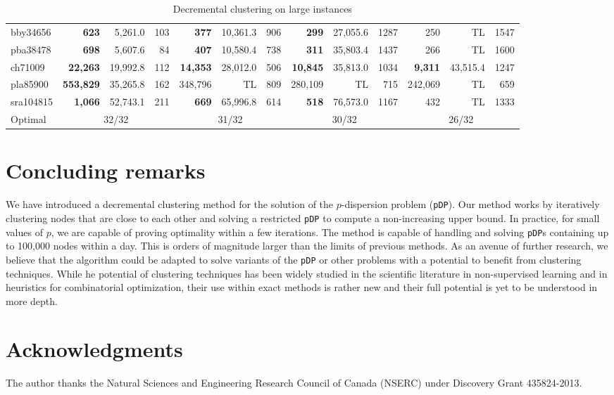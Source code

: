 \documentclass[a4paper,10pt]{article}
\newcommand{\pDP}{\texttt{pDP}}
\begin{document}
\begin{table}[!hbtp]
{\begin{tabular}{|l|rrr|rrr|rrr|rrr|}
			bby34656 & \textbf{623} & 5,261.0 & 103 & \textbf{377} & 10,361.3 & 906 & \textbf{299} & 27,055.6 & 1287 & 250 & TL & 1547\\
			pba38478 & \textbf{698} & 5,607.6 & 84 & \textbf{407} & 10,580.4 & 738 & \textbf{311} & 35,803.4 & 1437 & 266 & TL & 1600\\
			ch71009 & \textbf{22,263} & 19,992.8 & 112 & \textbf{14,353} & 28,012.0 & 506 & \textbf{10,845} & 35,813.0 & 1034 & \textbf{9,311} & 43,515.4 & 1247\\
			pla85900 & \textbf{553,829} & 35,265.8 & 162 & 348,796 & TL & 809 & 280,109 & TL & 715 & 242,069 & TL & 659\\
			sra104815 & \textbf{1,066} & 52,743.1 & 211 & \textbf{669} & 65,996.8 & 614 & \textbf{518} & 76,573.0 & 1167 & 432 & TL & 1333\\
			\hline
			Optimal & \multicolumn{3}{|c|}{32/32} & \multicolumn{3}{|c|}{31/32} & \multicolumn{3}{|c|}{30/32} & \multicolumn{3}{|c|}{26/32}\\
			\hline
	\end{tabular}}
	\caption{Decremental clustering on large instances\label{table:large}}
\end{table}

\section{Concluding remarks\label{section:conclusions}}

We have introduced a decremental clustering method for the solution of the $p$-dispersion problem (\pDP{}). Our method works by iteratively clustering nodes that are close to each other and solving a restricted \pDP{} to compute a non-increasing upper bound. In practice, for small values of $p$, we are capable of proving optimality within a few iterations. The method is capable of handling and solving \pDP{}s containing up to 100,000 nodes within a day. This is orders of magnitude larger than the limits of previous methods. As an avenue of further research, we believe that the algorithm could be adapted to solve variants of the \pDP{} or other problems with a potential to benefit from clustering techniques. While he potential of clustering techniques has been widely studied in the scientific literature in non-supervised learning and in heuristics for combinatorial optimization, their use within exact methods is rather new and their full potential is yet to be understood in more depth.

\section*{Acknowledgments}

The author thanks the Natural Sciences and Engineering Research Council of Canada (NSERC) under Discovery Grant 435824-2013.



\end{document}
